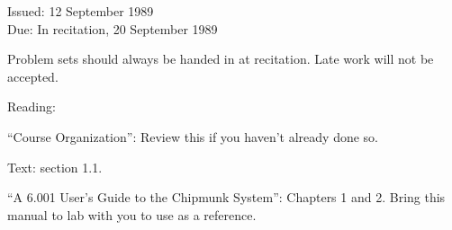 % 
% 
% 
% 
% 
% 






\medskip

\begin{flushleft}
Issued:  12 September 1989 \\
\smallskip
Due:  In recitation, 20 September 1989
\end{flushleft}

\noindent
{\small
Problem sets should always be handed in at recitation.  Late work will
not be accepted.}

\begin{flushleft}
Reading: 
\begin{tightlist}

\item ``Course Organization'': Review this if you haven't
already done so. 

\item Text: section 1.1.

\item  ``A 6.001 User's Guide to the Chipmunk System'': Chapters 1
and 2.  Bring this manual to lab with you to use as a reference.
\end{tightlist}
\end{flushleft}

